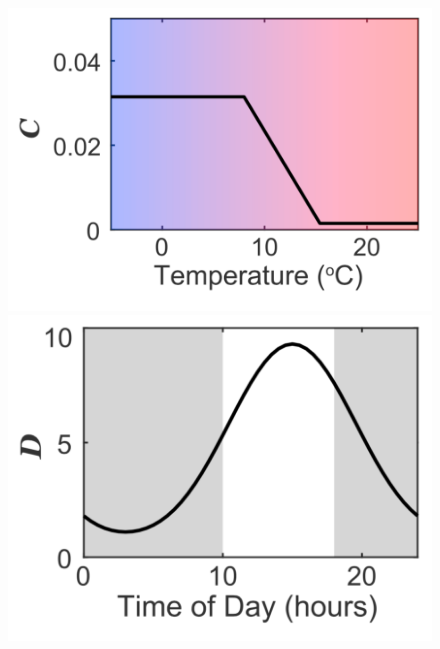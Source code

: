 \documentclass[11pt, a4paper]{article}
\begin{document}
\begin{figure}[H]
    \centering
    \begin{minipage}{0.4\textwidth}
        \centering
        \includegraphics[width=1.0\textwidth]{./images/param_C.png}
    \end{minipage}
    \hfill
    \begin{minipage}{0.4\textwidth}
        \centering
        \includegraphics[width=1.0\textwidth]{./images/param_D.png}
    \end{minipage}
\end{figure}
\end{document}
